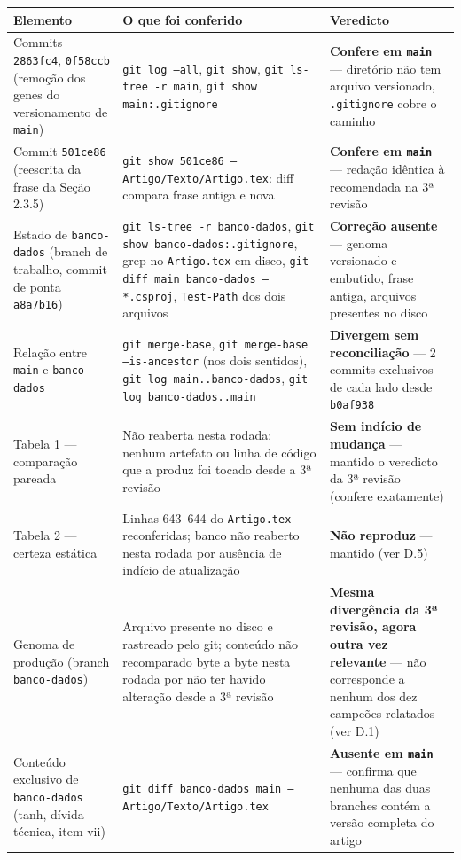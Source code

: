 \documentclass[11pt,a4paper]{article}
\begin{document}
\begin{longtable}{|p{3.6cm}|p{6.6cm}|p{4.4cm}|}
\hline
\textbf{Elemento} & \textbf{O que foi conferido} & \textbf{Veredicto} \\
\hline
\endhead
Commits \texttt{2863fc4}, \texttt{0f58ccb} (remoção dos genes do versionamento de \texttt{main}) &
\texttt{git log --all}, \texttt{git show}, \texttt{git ls-tree -r main}, \texttt{git show
main:.gitignore} & \textbf{Confere em \texttt{main}} --- diretório não tem arquivo versionado,
\texttt{.gitignore} cobre o caminho \\
\hline
Commit \texttt{501ce86} (reescrita da frase da Seção 2.3.5) & \texttt{git show 501ce86 --
Artigo/Texto/Artigo.tex}: diff compara frase antiga e nova & \textbf{Confere em \texttt{main}} ---
redação idêntica à recomendada na 3ª revisão \\
\hline
Estado de \texttt{banco-dados} (branch de trabalho, commit de ponta \texttt{a8a7b16}) &
\texttt{git ls-tree -r banco-dados}, \texttt{git show banco-dados:.gitignore}, grep no
\texttt{Artigo.tex} em disco, \texttt{git diff main banco-dados -- *.csproj}, \texttt{Test-Path} dos
dois arquivos & \textbf{Correção ausente} --- genoma versionado e embutido, frase antiga, arquivos
presentes no disco \\
\hline
Relação entre \texttt{main} e \texttt{banco-dados} & \texttt{git merge-base}, \texttt{git
merge-base --is-ancestor} (nos dois sentidos), \texttt{git log main..banco-dados},
\texttt{git log banco-dados..main} & \textbf{Divergem sem reconciliação} --- 2 commits exclusivos de
cada lado desde \texttt{b0af938} \\
\hline
Tabela 1 --- comparação pareada & Não reaberta nesta rodada; nenhum artefato ou linha de código que a
produz foi tocado desde a 3ª revisão & \textbf{Sem indício de mudança} --- mantido o veredicto da 3ª
revisão (confere exatamente) \\
\hline
Tabela 2 --- certeza estática & Linhas 643--644 do \texttt{Artigo.tex} reconferidas; banco não
reaberto nesta rodada por ausência de indício de atualização & \textbf{Não reproduz} --- mantido (ver
D.5) \\
\hline
Genoma de produção (branch \texttt{banco-dados}) & Arquivo presente no disco e rastreado pelo git;
conteúdo não recomparado byte a byte nesta rodada por não ter havido alteração desde a 3ª revisão &
\textbf{Mesma divergência da 3ª revisão, agora outra vez relevante} --- não corresponde a nenhum dos
dez campeões relatados (ver D.1) \\
\hline
Conteúdo exclusivo de \texttt{banco-dados} (tanh, dívida técnica, item vii) & \texttt{git diff
banco-dados main -- Artigo/Texto/Artigo.tex} & \textbf{Ausente em \texttt{main}} --- confirma que
nenhuma das duas branches contém a versão completa do artigo \\
\hline
\end{longtable}
\end{document}
